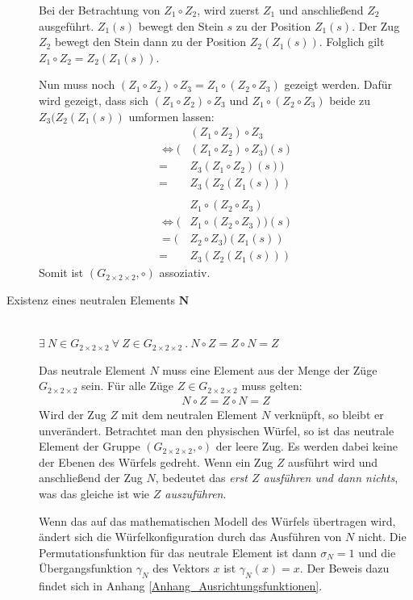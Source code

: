 \documentclass[12pt,a4paper, usenames, dvipsnames]{article}
\theoremstyle{mystyle}
\theoremstyle{definition}
\newcommand{\Gtwo}{\ensuremath{G_{2\times 2\times 2}}}
\begin{document}
\begin{description}
Bei der Betrachtung von $Z_1 \circ Z_2 $, wird zuerst $Z_1$ und anschließend $Z_2$ ausgeführt. $Z_1(s)$ bewegt den Stein $s$ zu der Position $Z_1(s)$. Der Zug $Z_2$ bewegt den Stein dann zu der Position $Z_2(Z_1(s))$. Folglich gilt $Z_1 \circ Z_2 = Z_2(Z_1(s))$. 


Nun muss noch $(Z_1 \circ Z_2) \circ Z_3 = Z_1 \circ (Z_2 \circ Z_3)$ gezeigt werden. Dafür wird gezeigt, dass sich $(Z_1 \circ Z_2) \circ Z_3$ und $Z_1 \circ (Z_2 \circ Z_3)$ beide zu $Z_3(Z_2(Z_1(s))$ umformen lassen: 
\begin{align*}
& (Z_1 \circ Z_2) \circ Z_3  \\
\Leftrightarrow (&(Z_1 \circ Z_2) \circ Z_3)(s) \\
= & Z_3(Z_1 \circ Z_2)(s)) \\
= & Z_3(Z_2(Z_1(s)))  
\\
\\
&Z_1 \circ (Z_2 \circ Z_3) \\
\Leftrightarrow (&Z_1 \circ (Z_2 \circ Z_3))(s) \\
= (&Z_2 \circ Z_3)(Z_1(s)) \\
= \ \ & Z_3(Z_2(Z_1(s)))  
\end{align*}
Somit ist $(\Gtwo, \circ)$ assoziativ.

\item [Existenz eines neutralen Elements $\boldsymbol{N}$] \ \\
$\exists \ N \in \Gtwo \  \forall \ Z \in \Gtwo \ . \ N \circ Z = Z \circ N = Z$ 


Das neutrale Element $N$ muss eine Element aus der Menge der Züge $\Gtwo$ sein. Für alle Züge $Z \in \Gtwo$ muss gelten: 
\begin{align*}
N \circ Z = Z \circ N = Z
\end{align*}
Wird der Zug $Z$ mit dem neutralen Element $N$ verknüpft, so bleibt er unverändert. Betrachtet man den physischen Würfel, so ist das neutrale Element der Gruppe $(\Gtwo, \circ)$ der leere Zug. Es werden dabei keine der Ebenen des Würfels gedreht. Wenn ein Zug $Z$ ausführt wird und anschließend der Zug $N$, bedeutet das \textit{erst $Z$ ausführen und dann nichts}, was das gleiche ist wie \textit{$Z$ auszuführen}. 

Wenn das auf das mathematischen Modell des Würfels übertragen wird, ändert sich die Würfelkonfiguration durch das Ausführen von $N$ nicht. Die Permutationsfunktion für das  neutrale Element ist dann $\sigma_N=1$ und die Übergangsfunktion $\gamma_N$ des Vektors $x$ ist $\gamma_N(x)=x$. Der Beweis dazu findet sich in Anhang \ref{Anhang_Ausrichtungsfunktionen}.


\end{description}
\end{document}
